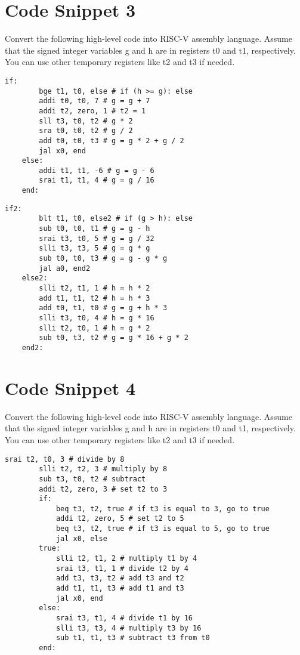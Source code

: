 \documentclass[12pt]{article}
\begin{document}
    \newpage
    \section{Code Snippet 3}
    \begin{flushleft}
        Convert the following high-level code into RISC-V assembly language. Assume
        that the signed integer variables g and h are in registers t0 and t1, respectively. You can
        use other temporary registers like t2 and t3 if needed.
    \end{flushleft}
    \begin{lstlisting}[language=RISCV]
    if: 
        bge t1, t0, else # if (h >= g): else
        addi t0, t0, 7 # g = g + 7
        addi t2, zero, 1 # t2 = 1
        sll t3, t0, t2 # g * 2
        sra t0, t0, t2 # g / 2
        add t0, t0, t3 # g = g * 2 + g / 2
        jal x0, end
    else:
        addi t1, t1, -6 # g = g - 6
        srai t1, t1, 4 # g = g / 16
    end:
    \end{lstlisting}

    \begin{lstlisting}[language=RISCV]
    if2: 
        blt t1, t0, else2 # if (g > h): else
        sub t0, t0, t1 # g = g - h
        srai t3, t0, 5 # g = g / 32
        slli t3, t3, 5 # g = g * g
        sub t0, t0, t3 # g = g - g * g
        jal a0, end2
    else2:
        slli t2, t1, 1 # h = h * 2
        add t1, t1, t2 # h = h * 3
        add t0, t1, t0 # g = g + h * 3
        slli t3, t0, 4 # h = g * 16
        slli t2, t0, 1 # h = g * 2
        sub t0, t3, t2 # g = g * 16 + g * 2
    end2:
        \end{lstlisting}
    \newpage
    \section{Code Snippet 4}
    \begin{flushleft}
        Convert the following high-level code into RISC-V assembly language. Assume
        that the signed integer variables g and h are in registers t0 and t1, respectively. You can
        use other temporary registers like t2 and t3 if needed.
    \end{flushleft}
    \begin{lstlisting}[language=RISCV]
        srai t2, t0, 3 # divide by 8
        slli t2, t2, 3 # multiply by 8
        sub t3, t0, t2 # subtract
        addi t2, zero, 3 # set t2 to 3
        if:
            beq t3, t2, true # if t3 is equal to 3, go to true
            addi t2, zero, 5 # set t2 to 5
            beq t3, t2, true # if t3 is equal to 5, go to true
            jal x0, else
        true:
            slli t2, t1, 2 # multiply t1 by 4
            srai t3, t1, 1 # divide t2 by 4
            add t3, t3, t2 # add t3 and t2
            add t1, t1, t3 # add t1 and t3
            jal x0, end
        else:
            srai t3, t1, 4 # divide t1 by 16
            slli t3, t3, 4 # multiply t3 by 16
            sub t1, t1, t3 # subtract t3 from t0
        end:
    \end{lstlisting}
\end{document}
